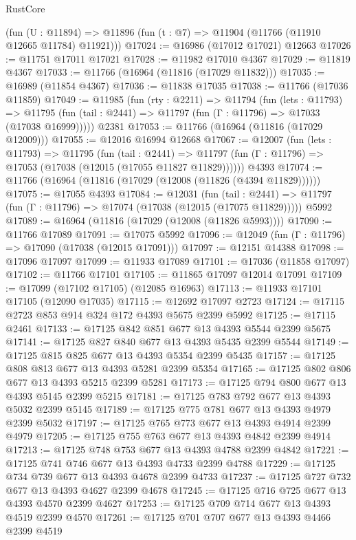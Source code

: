 \begin{lexlean}{RustCore}
\begin{coremodule}
    (fun (U : @11894) => @11896 (fun (t : @7) => @11904 (@11766 (@11910 @12665 @11784) @11921)))
@17024 := @16986 (@17012 @17021) @12663
@17026 := @11751 @17011 @17021
@17028 := @11982 @17010 @4367
@17029 := @11819 @4367
@17033 := @11766 (@16964 (@11816 (@17029 @11832)))
@17035 := @16989 (@11854 @4367)
@17036 := @11838 @17035
@17038 := @11766 (@17036 @11859)
@17049 := @11985
    (fun (rty : @2211) =>
    @11794
      (fun (lets : @11793) =>
      @11795 (fun (tail : @2441) => @11797 (fun (Γ : @11796) => @17033 (@17038 @16999)))))
    @2381
@17053 := @11766 (@16964 (@11816 (@17029 @12009)))
@17055 := @12016 @16994 @12668
@17067 := @12007
    (fun (lets : @11793) =>
    @11795
      (fun (tail : @2441) =>
      @11797 (fun (Γ : @11796) => @17053 (@17038 (@12015 (@17055 @11827 @11829))))))
    @4393
@17074 := @11766 (@16964 (@11816 (@17029 (@12008 (@11826 (@4394 @11829))))))
@17075 := @17055 @4393
@17084 := @12031
    (fun (tail : @2441) => @11797 (fun (Γ : @11796) => @17074 (@17038 (@12015 (@17075 @11829)))))
    @5992
@17089 := @16964 (@11816 (@17029 (@12008 (@11826 @5993))))
@17090 := @11766 @17089
@17091 := @17075 @5992
@17096 := @12049 (fun (Γ : @11796) => @17090 (@17038 (@12015 @17091)))
@17097 := @12151 @14388
@17098 := @17096 @17097
@17099 := @11933 @17089
@17101 := @17036 (@11858 @17097)
@17102 := @11766 @17101
@17105 := @11865 @17097 @12014 @17091
@17109 := @17099 (@17102 @17105) (@12085 @16963)
@17113 := @11933 @17101 @17105 (@12090 @17035)
@17115 := @12692 @17097 @2723
@17124 := @17115 @2723 @853 @914 @324 @172 @4393 @5675 @2399 @5992
@17125 := @17115 @2461
@17133 := @17125 @842 @851 @677 @13 @4393 @5544 @2399 @5675
@17141 := @17125 @827 @840 @677 @13 @4393 @5435 @2399 @5544
@17149 := @17125 @815 @825 @677 @13 @4393 @5354 @2399 @5435
@17157 := @17125 @808 @813 @677 @13 @4393 @5281 @2399 @5354
@17165 := @17125 @802 @806 @677 @13 @4393 @5215 @2399 @5281
@17173 := @17125 @794 @800 @677 @13 @4393 @5145 @2399 @5215
@17181 := @17125 @783 @792 @677 @13 @4393 @5032 @2399 @5145
@17189 := @17125 @775 @781 @677 @13 @4393 @4979 @2399 @5032
@17197 := @17125 @765 @773 @677 @13 @4393 @4914 @2399 @4979
@17205 := @17125 @755 @763 @677 @13 @4393 @4842 @2399 @4914
@17213 := @17125 @748 @753 @677 @13 @4393 @4788 @2399 @4842
@17221 := @17125 @741 @746 @677 @13 @4393 @4733 @2399 @4788
@17229 := @17125 @734 @739 @677 @13 @4393 @4678 @2399 @4733
@17237 := @17125 @727 @732 @677 @13 @4393 @4627 @2399 @4678
@17245 := @17125 @716 @725 @677 @13 @4393 @4570 @2399 @4627
@17253 := @17125 @709 @714 @677 @13 @4393 @4519 @2399 @4570
@17261 := @17125 @701 @707 @677 @13 @4393 @4466 @2399 @4519

\end{coremodule}
\end{lexlean}
